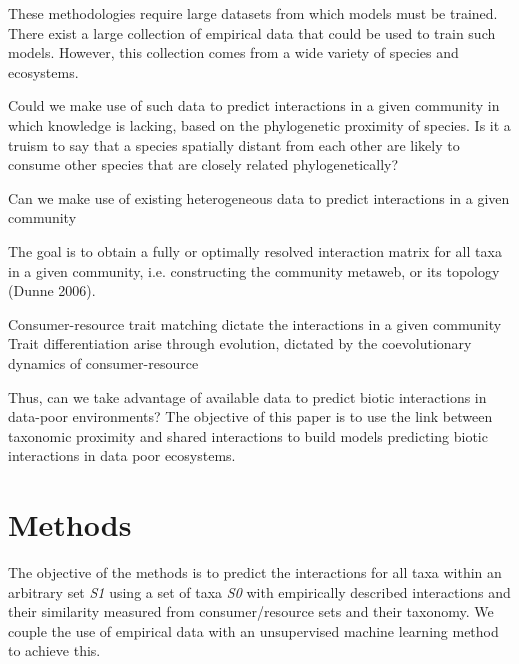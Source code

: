 \documentclass[letterpaper]{article}
\begin{document}



These methodologies require large datasets from which models must be trained. There exist a large collection of empirical data that could be used to train such models. However, this collection comes from a wide variety of species and ecosystems.

Could we make use of such data to predict interactions in a given community in which knowledge is lacking, based on the phylogenetic proximity of species. Is it a truism to say that a species spatially distant from each other are likely to consume other species that are closely related phylogenetically?




  Can we make use of existing heterogeneous data to predict interactions in a given community %

The goal is to obtain a fully or optimally resolved interaction matrix for all taxa in a given community, i.e. constructing the community metaweb, or its topology (Dunne 2006).



  Consumer-resource trait matching dictate the interactions in a given community
  Trait differentiation arise through evolution, dictated by the coevolutionary dynamics of consumer-resource


  Thus, can we take advantage of available data to predict biotic interactions in data-poor environments? The objective of this paper is to use the link between taxonomic proximity and shared interactions to build models predicting biotic interactions in data poor ecosystems.


\section{Methods}
The objective of the methods is to predict the interactions for all taxa within an arbitrary set \textit{S1} using a set of taxa \textit{S0} with empirically described interactions and their similarity measured from consumer/resource sets and their taxonomy. We couple the use of empirical data with an unsupervised machine learning method to achieve this.
\end{document}
